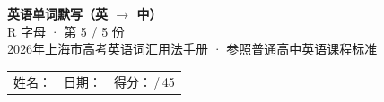 \documentclass[10pt,a4paper]{article}
\begin{document}
\pagestyle{plain}

\begin{center}
{\LARGE\bfseries 英语单词默写（英 $\to$ 中）}\\[0.22em]
{\large R 字母 · 第 5 / 5 份}\\[0.18em]
{\small 2026年上海市高考英语词汇用法手册 · 参照普通高中英语课程标准}
\end{center}

\vspace{0.25em}
\noindent\begin{tabular}{@{}p{}@{}p{}@{}p{}@{}}
姓名：\underline{\hspace{2.0cm}} & 日期：\underline{\hspace{2.0cm}} & 得分：\underline{\hspace{1.3cm}}\,/\,45 \\
\end{tabular}

\vspace{0.3em}

\vspace{0.08em}
\end{document}
